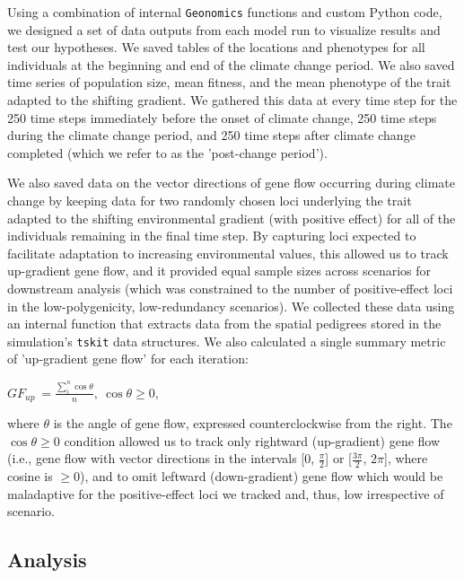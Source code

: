 \documentclass[9pt,twocolumn,twoside,lineno]{pnas-new}
\begin{document}
{Using a combination of internal \texttt{Geonomics} functions and custom Python code, we 
designed a set of data outputs from each model run to visualize 
results and test our hypotheses.
We saved tables of the locations and phenotypes for all individuals at
the beginning and end of the climate change period. We also saved time 
series of population size, mean fitness, and the mean phenotype of the trait adapted to 
the shifting gradient. We gathered this data at every time step for the 250 time steps immediately 
before the onset of climate change, 250 time steps during the climate change period, and 250 time steps after climate change completed (which we refer to as the 'post-change period').

We also saved data on the vector directions
of gene flow occurring during climate change by keeping 
data for two randomly chosen loci underlying the trait adapted to the shifting environmental gradient (with positive effect) for all of the individuals remaining in the final time step.
By capturing loci expected to facilitate 
adaptation to increasing environmental values, this allowed us to track up-gradient gene flow, and it  provided equal sample sizes across scenarios for downstream analysis (which was 
constrained to the number of positive-effect loci in
the low-polygenicity, low-redundancy scenarios). 
We collected these data using an internal function
that extracts data from the spatial pedigrees stored in the
simulation's \texttt{tskit} \cite{kelleher} data structures.
We also calculated a single summary metric of 'up-gradient gene flow' for each iteration:

$GF_{up}\ = \frac{\sum\limits_{i}^{n}\cos\theta}{n},\ \cos\theta\geq0$,

where $\theta$ is the angle of gene flow, expressed counterclockwise from the right.
The $\cos\theta\geq0$ condition allowed us to track only rightward (up-gradient) gene flow (i.e., gene flow with
vector directions in the intervals [0, $\frac{\pi}{2}$] or [$\frac{3\pi}{2}$, $2\pi$], where cosine is $\geq{0}$),
and to omit leftward (down-gradient) gene flow which would be maladaptive for
the positive-effect loci we tracked and, thus, low irrespective of scenario.


\subsection*{Analysis}

}
\end{document}
